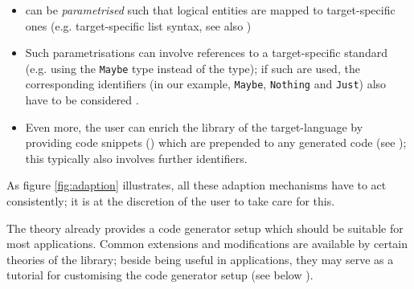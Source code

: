 \begin{isabellebody}
\begin{isamarkuptext}
  \begin{itemize}
    \item {} can be \emph{parametrised} such that
      logical entities are mapped to target-specific ones
      (e.g. target-specific list syntax,
        see also )
    \item Such parametrisations can involve references to a
      target-specific standard  (e.g. using
      the  \verb|Maybe| type instead
      of the   type);
      if such are used, the corresponding identifiers
      (in our example, \verb|Maybe|, \verb|Nothing|
      and \verb|Just|) also have to be considered .
    \item Even more, the user can enrich the library of the
      target-language by providing code snippets
      () which are prepended to
      any generated code (see );  this typically
      also involves further  identifiers.
  \end{itemize}

  \noindent As figure \ref{fig:adaption} illustrates, all these adaption mechanisms
  have to act consistently;  it is at the discretion of the user
  to take care for this.%
\end{isamarkuptext}%
\isamarkuptrue%
%
\isamarkuptrue%
%
\begin{isamarkuptext}%
The \hyperlink{theory.HOL}{\mbox{}} \hyperlink{theory.Main}{\mbox{}} theory already provides a code
  generator setup
  which should be suitable for most applications.  Common extensions
  and modifications are available by certain theories of the 
  library; beside being useful in applications, they may serve
  as a tutorial for customising the code generator setup (see below
  ).

  \begin{description}


\end{description}
\end{isamarkuptext}
\end{isabellebody}
